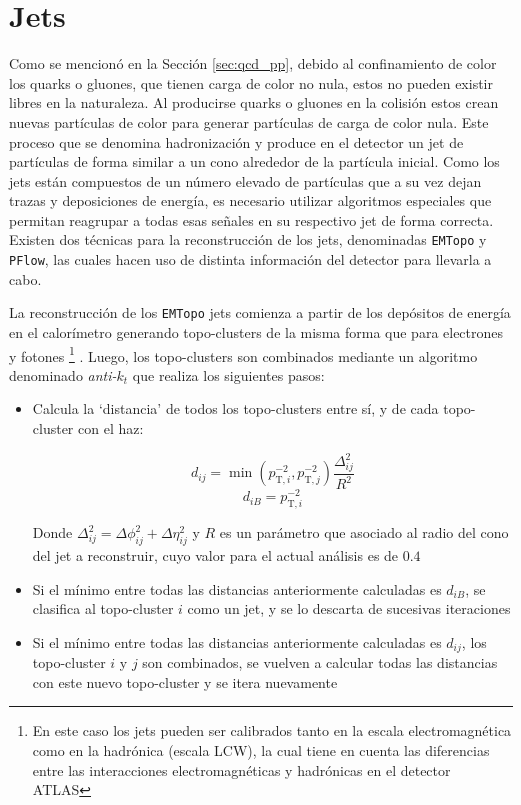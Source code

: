 \section{Jets}

Como se mencionó en la Sección \ref{sec:qcd_pp}, debido al confinamiento de color los quarks o gluones, que tienen carga de color no nula, estos no pueden existir libres en la naturaleza. Al producirse quarks o gluones en la colisión estos crean nuevas partículas de color para generar partículas de carga de color nula. Este proceso que se denomina hadronización y produce en el detector un jet de partículas de forma similar a un cono alrededor de la partícula inicial. Como los jets están compuestos de un número elevado de partículas que a su vez dejan trazas y deposiciones de energía, es necesario utilizar algoritmos especiales que permitan reagrupar a todas esas señales en su respectivo jet de forma correcta. Existen dos técnicas para la reconstrucción de los jets, denominadas \texttt{EMTopo} y \texttt{PFlow}, las cuales hacen uso de distinta información del detector para llevarla a cabo. 

La reconstrucción de los \texttt{EMTopo} jets comienza a partir de los depósitos de energía en el calorímetro generando topo-clusters de la misma forma que para electrones y fotones \footnote{En este caso los jets pueden ser calibrados tanto en la escala electromagnética como en la hadrónica (escala LCW), la cual tiene en cuenta las diferencias entre las interacciones electromagnéticas y hadrónicas en el detector ATLAS} \cite{Lampl:1099735}. Luego, los topo-clusters son combinados mediante un algoritmo denominado \textit{anti-$k_t$} \cite{Cacciari:2008gp} que realiza los siguientes pasos:

\begin{itemize}
	\item Calcula la `distancia' de todos los topo-clusters entre sí, y de cada topo-cluster con el haz:

	\begin{equation}
		d_{ij} = \min(p_{\text{T},i}^{-2}, p_{\text{T},j}^{-2})\frac{\Delta_{ij}^{2}}{R^{2}}
	\end{equation}
	\begin{equation}
		d_{iB} = p_{\text{T},i}^{-2}
	\end{equation}

	Donde $\Delta_{ij}^{2} = \Delta\phi_{ij}^{2} + \Delta\eta_{ij}^{2}$ y $R$ es un parámetro que asociado al radio del cono del jet a reconstruir, cuyo valor para el actual análisis es de $0.4$

	\item Si el mínimo entre todas las distancias anteriormente calculadas es $d_{iB}$, se clasifica al topo-cluster $i$ como un jet, y se lo descarta de sucesivas iteraciones

	\item Si el mínimo entre todas las distancias anteriormente calculadas es $d_{ij}$, los topo-cluster $i$ y $j$ son combinados, se vuelven a calcular todas las distancias con este nuevo topo-cluster y se itera nuevamente 

\end{itemize}

